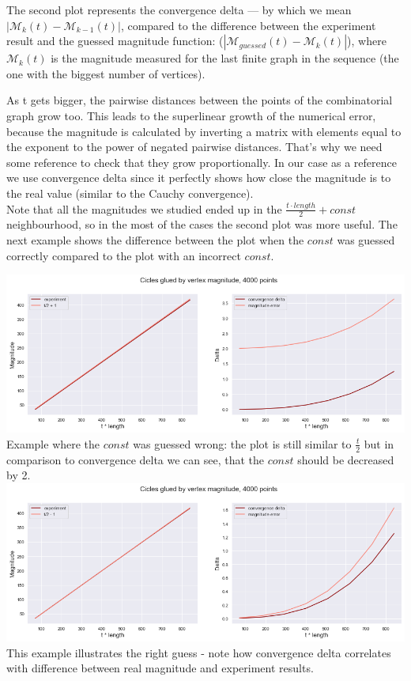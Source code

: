 \documentclass{article}
\begin{document}
The second plot represents the convergence delta --- by which we mean 
$|\mathcal{M}_k(t) - \mathcal{M}_{k - 1}(t)|$, compared to the difference between
the experiment result and the guessed magnitude function:  ($|\mathcal{M}_{guessed}(t) - \mathcal{M}_k(t)|$),
where $\mathcal{M}_k(t)$ is the magnitude measured for the last finite graph in
the sequence (the one with the biggest number of vertices).

As t gets bigger, the pairwise distances between the points of the combinatorial
graph grow too. This leads to the superlinear growth of the numerical error, because
the magnitude is calculated by inverting a matrix with elements equal to the exponent
to the power of negated pairwise distances. That's why we need some reference
to check that they grow proportionally.
In our case as a reference we use convergence delta since it perfectly shows how close
the magnitude is to the real value (similar to the Cauchy convergence).
\\

Note that all the magnitudes we studied ended up in the $\frac{t \cdot length}{2} + const$
neighbourhood, so in the most of the cases the second plot was more useful. The
next example shows the difference between the plot when the $const$ was guessed
correctly compared to the plot with an incorrect $const$.

\begin{center}
    \includegraphics[width=\textwidth]{cicles_glued_by_vertex_wrong} Example 
    where the $const$ was guessed wrong: the plot is still similar to $\frac{t}{2}$
    but in comparison to convergence delta we can see, that the $const$ should be decreased by 2. \
\includegraphics[width=\textwidth]{cicles_glued_by_vertex_right} This example illustrates
    the right guess - note how convergence delta correlates with difference between real
    magnitude and experiment results.
\end{center}
\end{document}
